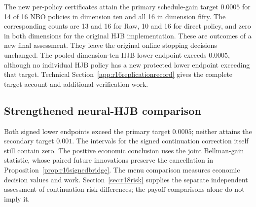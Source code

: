 The new per-policy certificates attain the primary schedule-gain target
$0.0005$ for 14 of 16 NBO policies in dimension ten and all 16 in dimension
fifty. The corresponding counts are 13 and 16 for Raw, 10 and 16 for direct
policy, and zero in both dimensions for the original HJB implementation.
These are outcomes of a new final assessment. They leave the original online
stopping decisions unchanged. The pooled dimension-ten HJB lower endpoint
exceeds $0.0005$, although no individual HJB policy has a new protected lower
endpoint exceeding that target. Technical
Section~\ref{app:r16replicationrecord} gives the complete target account and
additional verification work.

\subsection{Strengthened neural-HJB comparison}\label{sec:r16hjbresults}



\label{sec:r16mechanismresults}
Both signed lower endpoints exceed the primary target $0.0005$; neither
attains the secondary target $0.001$. The intervals for the signed continuation
correction itself still contain zero. The positive economic conclusion uses
the joint Bellman-gain statistic, whose paired future innovations preserve
the cancellation in Proposition~\ref{prop:r16signedbridge}.
The menu comparison measures economic decision values and work.
Section~\ref{sec:r18risk} supplies the separate independent assessment of
continuation-risk differences; the payoff comparisons alone do not imply it.
